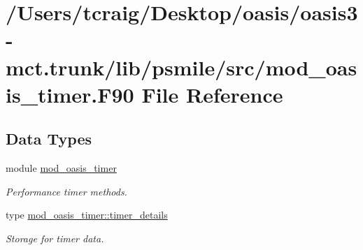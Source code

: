\hypertarget{mod__oasis__timer_8_f90}{\section{/\+Users/tcraig/\+Desktop/oasis/oasis3-\/mct.trunk/lib/psmile/src/mod\+\_\+oasis\+\_\+timer.F90 File Reference}
\label{mod__oasis__timer_8_f90}
}
\subsection*{Data Types}
\begin{DoxyCompactItemize}
\item 
module \hyperlink{classmod__oasis__timer}{mod\+\_\+oasis\+\_\+timer}
\begin{DoxyCompactList}\small\item\em Performance timer methods. \end{DoxyCompactList}\item 
type \hyperlink{structmod__oasis__timer_1_1timer__details}{mod\+\_\+oasis\+\_\+timer\+::timer\+\_\+details}
\begin{DoxyCompactList}\small\item\em Storage for timer data. \end{DoxyCompactList}\end{DoxyCompactItemize}
